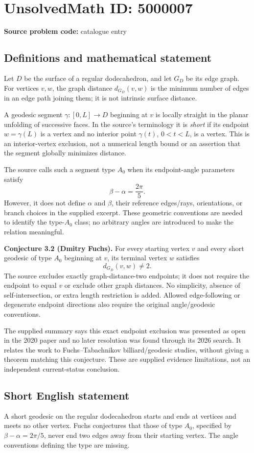\documentclass[11pt]{article}
\begin{document}
\section*{UnsolvedMath ID: 5000007}
\textbf{Source problem code:} catalogue entry
\subsection{Definitions and mathematical statement}
Let $D$ be the surface of a regular dodecahedron, and let $G_D$ be its edge graph. For vertices $v,w$, the graph distance $d_{G_D}(v,w)$ is the minimum number of edges in an edge path joining them; it is not intrinsic surface distance.

A geodesic segment $\gamma:[0,L]\to D$ beginning at $v$ is locally straight in the planar unfolding of successive faces. In the source's terminology it is \emph{short} if its endpoint $w=\gamma(L)$ is a vertex and no interior point $\gamma(t)$, $0<t<L$, is a vertex. This is an interior-vertex exclusion, not a numerical length bound or an assertion that the segment globally minimizes distance.

The source calls such a segment type $A_0$ when its endpoint-angle parameters satisfy
\[
 \beta-\alpha=\frac{2\pi}{5}.
\]
However, it does not define $\alpha$ and $\beta$, their reference edges/rays, orientations, or branch choices in the supplied excerpt. These geometric conventions are needed to identify the type-$A_0$ class; no arbitrary angles are introduced to make the relation meaningful.

\textbf{Conjecture 3.2 (Dmitry Fuchs).} For every starting vertex $v$ and every short geodesic of type $A_0$ beginning at $v$, its terminal vertex $w$ satisfies
\[
 d_{G_D}(v,w)\ne2.
\]
The source excludes exactly graph-distance-two endpoints; it does not require the endpoint to equal $v$ or exclude other graph distances. No simplicity, absence of self-intersection, or extra length restriction is added. Allowed edge-following or degenerate endpoint directions also require the original angle/geodesic conventions.

The supplied summary says this exact endpoint exclusion was presented as open in the 2020 paper and no later resolution was found through its 2026 search. It relates the work to Fuchs--Tabachnikov billiard/geodesic studies, without giving a theorem matching this conjecture. These are supplied evidence limitations, not an independent current-status conclusion.
\subsection{Short English statement}
A short geodesic on the regular dodecahedron starts and ends at vertices and meets no other vertex. Fuchs conjectures that those of type $A_0$, specified by $\beta-\alpha=2\pi/5$, never end two edges away from their starting vertex. The angle conventions defining the type are missing.
\end{document}
